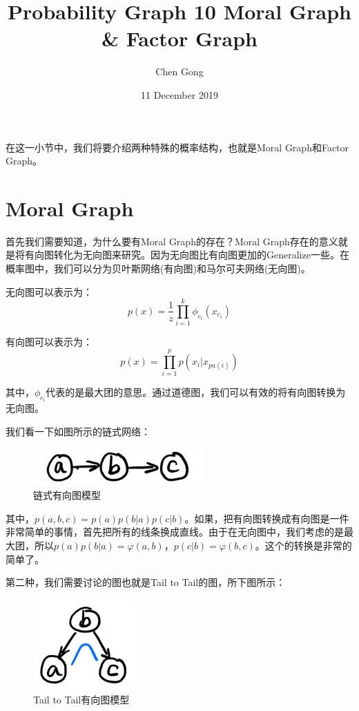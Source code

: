 \documentclass[a4paper]{article}
\title{Probability Graph 10 Moral Graph \& Factor Graph}
\author{Chen Gong}
\date{11 December 2019}
\begin{document}
\maketitle
在这一小节中，我们将要介绍两种特殊的概率结构，也就是Moral Graph和Factor Graph。

\section{Moral Graph}
首先我们需要知道，为什么要有Moral Graph的存在？Moral Graph存在的意义就是将有向图转化为无向图来研究。因为无向图比有向图更加的Generalize一些。在概率图中，我们可以分为贝叶斯网络(有向图)和马尔可夫网络(无向图)。

无向图可以表示为：
\begin{equation}
    p(x) = \frac{1}{z}\prod_{i=1}^k \phi_{c_i}(x_{c_i})
\end{equation}

有向图可以表示为：
\begin{equation}
    p(x) = \prod_{i=1}^pp(x_i|x_{pa(i)})
\end{equation}

其中，$\phi_{c_i}$代表的是最大团的意思。通过道德图，我们可以有效的将有向图转换为无向图。

我们看一下如图所示的链式网络：
\begin{figure}[H]
    \centering
    \includegraphics[width=.25\textwidth]{微信图片_20191211151651.png}
    \caption{链式有向图模型}
    
\end{figure}

其中，$p(a,b,c) = p(a)p(b|a)p(c|b)$。如果，把有向图转换成有向图是一件非常简单的事情，首先把所有的线条换成直线。由于在无向图中，我们考虑的是最大团，所以$p(a)p(b|a) = \varphi(a,b)$，$p(c|b) = \varphi(b,c)$。这个的转换是非常的简单了。

第二种，我们需要讨论的图也就是Tail to Tail的图，所下图所示：
\begin{figure}[H]
    \centering
    \includegraphics[width=.15\textwidth]{微信图片_20191211152752.png}
    \caption{Tail to Tail有向图模型}
    
\end{figure}
\end{document}
